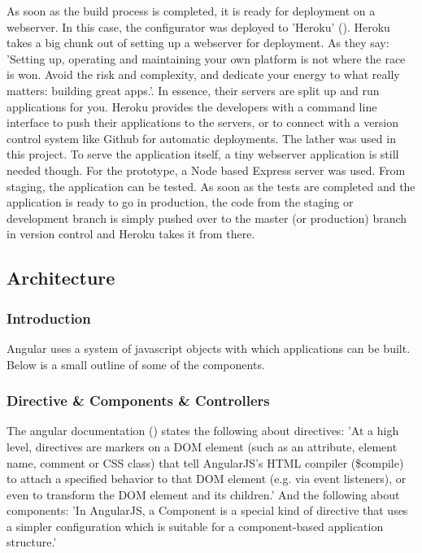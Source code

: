 As soon as the build process is completed, it is ready for deployment on a webserver. In this case, the configurator was deployed to 'Heroku' (\cite{heroku}). Heroku takes a big chunk out of setting up a webserver for deployment. As they say: 'Setting up, operating and maintaining your own platform is not where the race is won. Avoid the risk and complexity, and dedicate your energy to what really matters: building great apps.'. In essence, their servers are split up and run applications for you. Heroku provides the developers with a command line interface to push their applications to the servers, or to connect with a version control system like Github for automatic deployments. The lather was used in this project. To serve the application itself, a tiny webserver application is still needed though. For the prototype, a Node based Express server was used.\newline
From staging, the application can be tested. As soon as the tests are completed and the application is ready to go in production, the code from the staging or development branch is simply pushed over to the master (or production) branch in version control and Heroku takes it from there.

\subsection{Architecture}
\subsubsection{Introduction}
Angular uses a system of javascript objects with which applications can be built. Below is a small outline of some of the components.\newline
\subsubsection{Directive \& Components \& Controllers}
The angular documentation (\cite{angularConcepts}) states the following about directives: \newline
'At a high level, directives are markers on a DOM element (such as an attribute, element name, comment or CSS class) that tell AngularJS's HTML compiler (\$compile) to attach a specified behavior to that DOM element (e.g. via event listeners), or even to transform the DOM element and its children.'\newline
And the following about components:\newline
'In AngularJS, a Component is a special kind of directive that uses a simpler configuration which is suitable for a component-based application structure.'\newline

